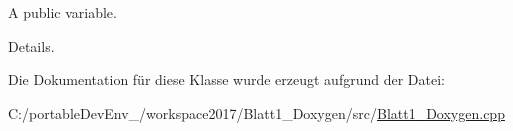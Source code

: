 A public variable. 

Details. 

Die Dokumentation für diese Klasse wurde erzeugt aufgrund der Datei\+:\begin{DoxyCompactItemize}
\item 
C\+:/portable\+Dev\+Env\+\_/workspace2017/\+Blatt1\+\_\+\+Doxygen/src/\hyperlink{_blatt1___doxygen_8cpp}{Blatt1\+\_\+\+Doxygen.\+cpp}\end{DoxyCompactItemize}
